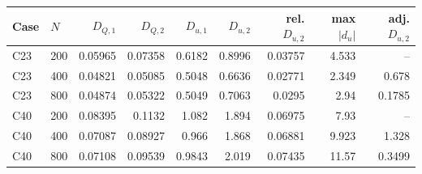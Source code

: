 \begin{tabular}{llrrrrrrr}
\toprule
Case & $N$ & $D_{Q,1}$ & $D_{Q,2}$ & $D_{u,1}$ & $D_{u,2}$ & rel. $D_{u,2}$ & max $|d_u|$ & adj. $D_{u,2}$ \\
\midrule
C23 & 200 & 0.05965 & 0.07358 & 0.6182 & 0.8996 & 0.03757 & 4.533 & -- \\
C23 & 400 & 0.04821 & 0.05085 & 0.5048 & 0.6636 & 0.02771 & 2.349 & 0.678 \\
C23 & 800 & 0.04874 & 0.05322 & 0.5049 & 0.7063 & 0.0295 & 2.94 & 0.1785 \\
C40 & 200 & 0.08395 & 0.1132 & 1.082 & 1.894 & 0.06975 & 7.93 & -- \\
C40 & 400 & 0.07087 & 0.08927 & 0.966 & 1.868 & 0.06881 & 9.923 & 1.328 \\
C40 & 800 & 0.07108 & 0.09539 & 0.9843 & 2.019 & 0.07435 & 11.57 & 0.3499 \\
\bottomrule
\end{tabular}
